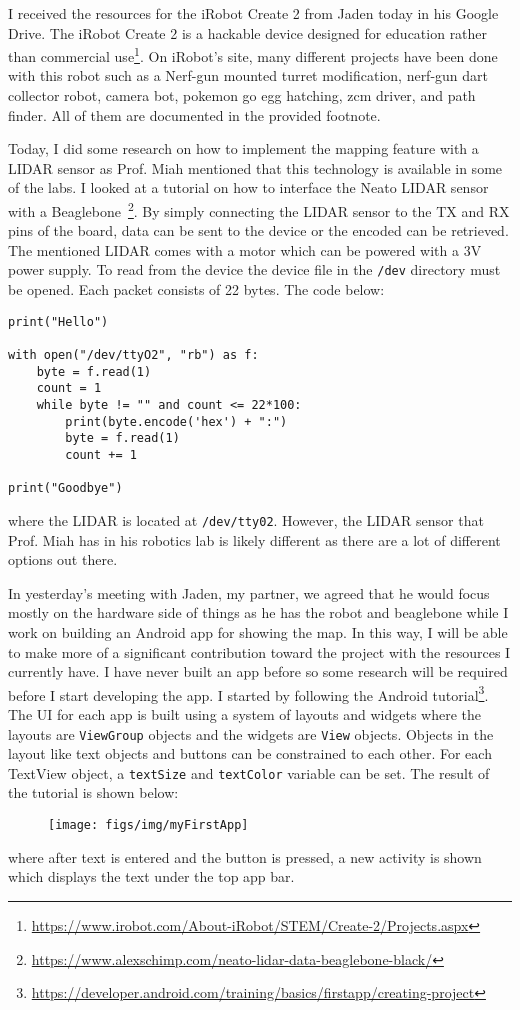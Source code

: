 \documentclass[fontsize=11pt, %
                             paper=a4, %
                             twoside, %
                             captions=tableheading,
                             index=totoc,
                             hyperref]{labbook}
\begin{document}
\begin{addmargin}[0cm]{0cm}
I received the resources for the iRobot Create 2 from Jaden today in his Google Drive. The iRobot Create 2 is a hackable device designed for education rather than commercial use\footnote{\url{https://www.irobot.com/About-iRobot/STEM/Create-2/Projects.aspx}}. On iRobot's site, many different projects have been done with this robot such as a Nerf-gun mounted turret modification, nerf-gun dart collector robot, camera bot, pokemon go egg hatching, zcm driver, and path finder. All of them are documented in the provided footnote.

Today, I did some research on how to implement the mapping feature with a LIDAR sensor as Prof. Miah mentioned that this technology is available in some of the labs. I looked at a tutorial on how to interface the Neato LIDAR sensor with a Beaglebone~\footnote{\url{https://www.alexschimp.com/neato-lidar-data-beaglebone-black/}}. By simply connecting the LIDAR sensor to the TX and RX pins of the board, data can be sent to the device or the encoded can be retrieved. The mentioned LIDAR comes with a motor which can be powered with a $3$V power supply. To read from the device the device file in the \texttt{/dev} directory must be opened. Each packet consists of 22 bytes. The code below:
\begin{Verbatim}
print("Hello")

with open("/dev/ttyO2", "rb") as f:
    byte = f.read(1)
    count = 1
    while byte != "" and count <= 22*100:
        print(byte.encode('hex') + ":")
        byte = f.read(1)
        count += 1

print("Goodbye")
\end{Verbatim}
where the LIDAR is located at \texttt{/dev/tty02}. However, the LIDAR sensor that Prof. Miah has in his robotics lab is likely different as there are a lot of different options out there.

In yesterday's meeting with Jaden, my partner, we agreed that he would focus mostly on the hardware side of things as he has the robot and beaglebone while I work on building an Android app for showing the map. In this way, I will be able to make more of a significant contribution toward the project with the resources I currently have. I have never built an app before so some research will be required before I start developing the app.
\smallbreak\noindent
I started by following the Android tutorial\footnote{\url{https://developer.android.com/training/basics/firstapp/creating-project}}. The UI for each app is built using a system of layouts and widgets where the layouts are \texttt{ViewGroup} objects and the widgets are \texttt{View} objects. Objects in the layout like text objects and buttons can be constrained to each other. For each TextView object, a \texttt{textSize} and \texttt{textColor} variable can be set. The result of the tutorial is shown below:
\begin{figure}[H]
\centering
\texttt{[image: figs/img/myFirstApp]}
\end{figure}
where after text is entered and the button is pressed, a new activity is shown which displays the text under the top app bar.


\end{addmargin}
\end{document}
